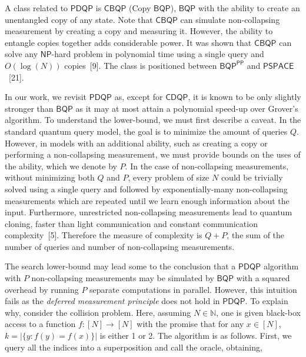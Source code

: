 A class related to $\mathsf{PDQP}$ is $\mathsf{CBQP}$ (Copy $\mathsf{BQP}$), $\mathsf{BQP}$ with the ability to create an unentangled copy of any state. Note that $\mathsf{CBQP}$ can simulate non-collapsing measurement by creating a copy and measuring it. However, the ability to entangle copies together adds considerable power. It was shown that $\mathsf{CBQP}$ can solve any $\mathsf{NP}$-hard problem in polynomial time using a single query and $O(\log(N))$ copies [9]. The class is positioned between $\mathsf{BQP}^{\mathsf{PP}}$ and $\mathsf{PSPACE}$ [21].\par




In our work, we revisit $\mathsf{PDQP}$ as, except for $\mathsf{CDQP}$, it is known to be only slightly stronger than $\mathsf{BQP}$ as it may at most attain a polynomial speed-up over Grover’s algorithm. To understand the lower-bound, we must first describe a caveat. In the standard quantum query model, the goal is to minimize the amount of queries $Q$. However, in models with an additional ability, such as creating a copy or performing a non-collapsing measurement, we must provide bounds on the uses of the ability, which we denote by $P$. In the case of non-collapsing measurements, without minimizing both $Q$ and $P$, every problem of size $N$ could be trivially solved using a single query and followed by exponentially-many non-collapsing measurements which are repeated until we learn enough information about the input. Furthermore, unrestricted non-collapsing measurements lead to quantum cloning, faster than light communication and constant communication complexity [5]. Therefore the measure of complexity is $Q+P$, the sum of the number of queries and number of non-collapsing measurements.\par




The search lower-bound may lead some to the conclusion that a $\mathsf{PDQP}$ algorithm with $P$ non-collapsing measurements may be simulated by $\mathsf{BQP}$ with a squared overhead by running $P$ separate computations in parallel. However, this intuition fails as the \emph{deferred measurement principle} does not hold in $\mathsf{PDQP}$. To explain why, consider the collision problem. Here, assuming $N\in\mathbb{N}$, one is given black-box access to a function $f:[N]\rightarrow[N]$ with the promise that for any $x\in[N]$, $k=|\{y:f(y)=f(x)\}|$ is either 1 or 2. The algorithm is as follows. First, we query all the indices into a superposition and call the oracle, obtaining,\par


